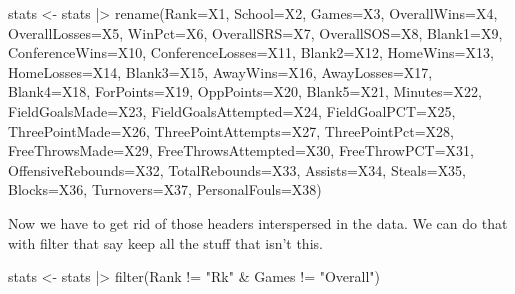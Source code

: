 \documentclass[
  letterpaper,
  DIV=11,
  numbers=noendperiod]{scrreprt}
\newenvironment{Shaded}{\begin{snugshade}}{\end{snugshade}}
\newcommand{\AttributeTok}[1]{\textcolor[rgb]{0.40,0.45,0.13}{#1}}
\newcommand{\FunctionTok}[1]{\textcolor[rgb]{0.28,0.35,0.67}{#1}}
\newcommand{\NormalTok}[1]{\textcolor[rgb]{0.00,0.23,0.31}{#1}}
\newcommand{\OtherTok}[1]{\textcolor[rgb]{0.00,0.23,0.31}{#1}}
\newcommand{\SpecialCharTok}[1]{\textcolor[rgb]{0.37,0.37,0.37}{#1}}
\newcommand{\StringTok}[1]{\textcolor[rgb]{0.13,0.47,0.30}{#1}}
\begin{document}
\begin{Shaded}
\begin{Highlighting}[]
\NormalTok{stats }\OtherTok{\textless{}{-}}\NormalTok{ stats }\SpecialCharTok{|\textgreater{}} \FunctionTok{rename}\NormalTok{(}\AttributeTok{Rank=}\NormalTok{X1, }\AttributeTok{School=}\NormalTok{X2, }\AttributeTok{Games=}\NormalTok{X3, }\AttributeTok{OverallWins=}\NormalTok{X4, }\AttributeTok{OverallLosses=}\NormalTok{X5, }\AttributeTok{WinPct=}\NormalTok{X6, }\AttributeTok{OverallSRS=}\NormalTok{X7, }\AttributeTok{OverallSOS=}\NormalTok{X8, }\AttributeTok{Blank1=}\NormalTok{X9, }\AttributeTok{ConferenceWins=}\NormalTok{X10, }\AttributeTok{ConferenceLosses=}\NormalTok{X11, }\AttributeTok{Blank2=}\NormalTok{X12, }\AttributeTok{HomeWins=}\NormalTok{X13, }\AttributeTok{HomeLosses=}\NormalTok{X14, }\AttributeTok{Blank3=}\NormalTok{X15, }\AttributeTok{AwayWins=}\NormalTok{X16, }\AttributeTok{AwayLosses=}\NormalTok{X17, }\AttributeTok{Blank4=}\NormalTok{X18, }\AttributeTok{ForPoints=}\NormalTok{X19, }\AttributeTok{OppPoints=}\NormalTok{X20, }\AttributeTok{Blank5=}\NormalTok{X21, }\AttributeTok{Minutes=}\NormalTok{X22, }\AttributeTok{FieldGoalsMade=}\NormalTok{X23, }\AttributeTok{FieldGoalsAttempted=}\NormalTok{X24, }\AttributeTok{FieldGoalPCT=}\NormalTok{X25, }\AttributeTok{ThreePointMade=}\NormalTok{X26, }\AttributeTok{ThreePointAttempts=}\NormalTok{X27, }\AttributeTok{ThreePointPct=}\NormalTok{X28, }\AttributeTok{FreeThrowsMade=}\NormalTok{X29, }\AttributeTok{FreeThrowsAttempted=}\NormalTok{X30, }\AttributeTok{FreeThrowPCT=}\NormalTok{X31, }\AttributeTok{OffensiveRebounds=}\NormalTok{X32, }\AttributeTok{TotalRebounds=}\NormalTok{X33, }\AttributeTok{Assists=}\NormalTok{X34, }\AttributeTok{Steals=}\NormalTok{X35, }\AttributeTok{Blocks=}\NormalTok{X36, }\AttributeTok{Turnovers=}\NormalTok{X37, }\AttributeTok{PersonalFouls=}\NormalTok{X38)}
\end{Highlighting}
\end{Shaded}

Now we have to get rid of those headers interspersed in the data. We can
do that with filter that say keep all the stuff that isn't this.

\begin{Shaded}
\begin{Highlighting}[]
\NormalTok{stats }\OtherTok{\textless{}{-}}\NormalTok{ stats }\SpecialCharTok{|\textgreater{}} \FunctionTok{filter}\NormalTok{(Rank }\SpecialCharTok{!=} \StringTok{"Rk"} \SpecialCharTok{\&}\NormalTok{ Games }\SpecialCharTok{!=} \StringTok{"Overall"}\NormalTok{) }
\end{Highlighting}
\end{Shaded}
\end{document}

